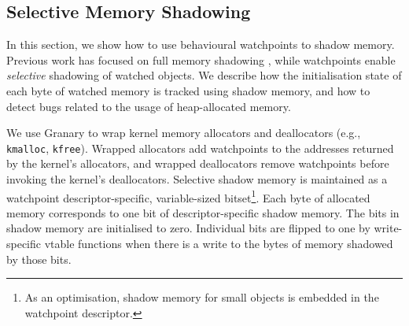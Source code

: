 \documentclass[letterpaper,twocolumn,10pt]{article}
\begin{document}

\subsection{Selective Memory Shadowing\label{sec:uninitialised_memory}}

In this section, we show how to use behavioural watchpoints to shadow memory. Previous work has focused on full memory shadowing \cite{Memcheck}, while watchpoints enable \emph{selective} shadowing of watched objects. We describe how the initialisation state of each byte of watched memory is tracked using shadow memory, and how to detect bugs related to the usage of heap-allocated memory.

We use Granary to wrap kernel memory allocators and deallocators (e.g., \texttt{kmalloc}, \texttt{kfree}). Wrapped allocators add watchpoints to the addresses returned by the kernel's allocators, and wrapped deallocators remove watchpoints before invoking the kernel's deallocators. Selective shadow memory is maintained as a watchpoint descriptor-specific, variable-sized bitset\footnote{As an optimisation, shadow memory for small objects is embedded in the watchpoint descriptor.}. Each byte of allocated memory corresponds to one bit of descriptor-specific shadow memory. The bits in shadow memory are initialised to zero. Individual bits are flipped to one by write-specific vtable functions when there is a write to the bytes of memory shadowed by those bits. 

 



\end{document}
